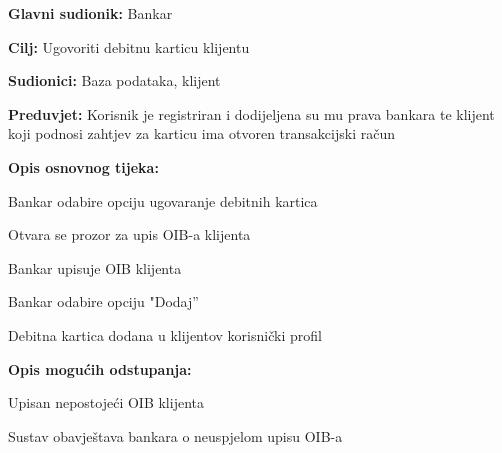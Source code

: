                 
                \noindent {}
                \begin{packed_item}
                
                  \item \textbf{Glavni sudionik: }Bankar
                  \item  \textbf{Cilj:} Ugovoriti debitnu karticu klijentu
                  \item  \textbf{Sudionici:} Baza podataka, klijent
                  \item  \textbf{Preduvjet:} Korisnik je registriran i dodijeljena su mu prava bankara te klijent koji podnosi zahtjev za karticu ima otvoren transakcijski račun 
                  \item  \textbf{Opis osnovnog tijeka:}
                  
                  \item[] \begin{packed_enum}
                
                    \item Bankar odabire opciju ugovaranje debitnih kartica
                    \item Otvara se prozor za upis OIB-a klijenta
                    \item Bankar upisuje OIB klijenta
                    \item Bankar odabire  opciju "Dodaj”
                    \item Debitna kartica dodana u klijentov korisnički profil 
                    \item 
                  \end{packed_enum}
                  
                  \item  \textbf{Opis mogućih odstupanja:}
                  
                  \item[] \begin{packed_item}
                
                        \item[2.a] Upisan nepostojeći OIB klijenta
                    \item[] \begin{packed_enum}
                      
                      \item Sustav obavještava bankara o neuspjelom upisu OIB-a
                      
                    \end{packed_enum}
                    
                  \end{packed_item}
                \end{packed_item}
                
